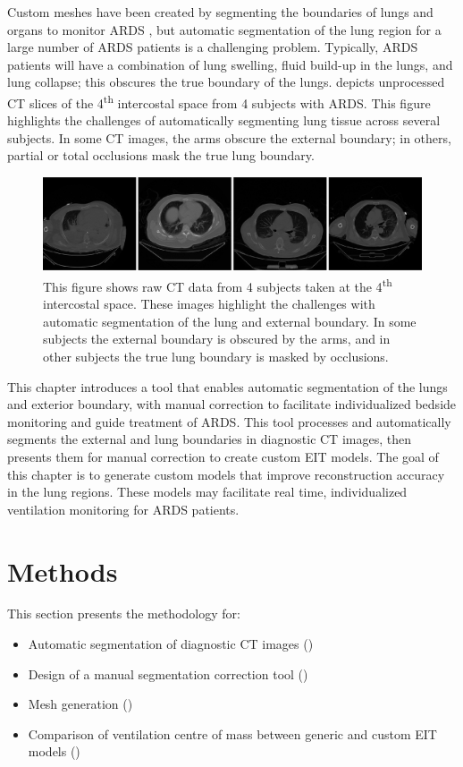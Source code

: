 Custom meshes have been created by segmenting the boundaries of lungs and organs
to monitor ARDS \parencite{yang_lung_2021}, but automatic segmentation of the lung region 
for a large number of ARDS patients is a challenging problem. Typically, ARDS patients 
will have a combination of
lung swelling, fluid build-up in the lungs, and lung collapse; this
obscures the 
true boundary of the lungs.  depicts unprocessed CT slices 
of the 4\textsuperscript{th} intercostal space from 4 subjects with
ARDS. This figure highlights the challenges  of automatically 
segmenting lung tissue across several subjects. 
In some CT images, the arms obscure the external boundary; in 
others, partial or total occlusions 
mask the true lung boundary.

\begin{figure}[H]
	\centering
	\includegraphics[width=\textwidth]{chapter5-CT_to_mesh/imgs/raw_ct_imgs.png}
	\caption[Raw CT images at the 4\textsuperscript{th} intersoctal space]{\label{fig:raw-ct}%
	This figure shows raw CT data from 4 subjects  taken at the 4\textsuperscript{th} intercostal space.
	These images highlight the challenges with automatic segmentation of the lung and external boundary. 
	In some subjects the external boundary is obscured by the arms, and in other subjects the 
	true lung boundary is masked by occlusions.
	}
\end{figure}

This chapter introduces a tool that enables automatic segmentation 
of the lungs and exterior boundary, with manual correction to facilitate individualized
bedside monitoring and guide treatment of ARDS.
This tool processes and automatically segments the external and lung boundaries 
in diagnostic CT images, 
then presents them for manual correction 
to create custom EIT models. 
The goal of this chapter is to generate custom models that improve reconstruction 
accuracy
in the lung regions. 
These models may facilitate real time, individualized ventilation
monitoring for ARDS patients.  

\section{Methods}
This section presents the methodology for:
\begin{itemize}
	\item Automatic segmentation of diagnostic CT images ()
	\item Design of a manual segmentation correction tool ()
	\item Mesh generation ()
	\item Comparison of ventilation centre of mass 
	between generic and custom EIT models ()
\end{itemize}

